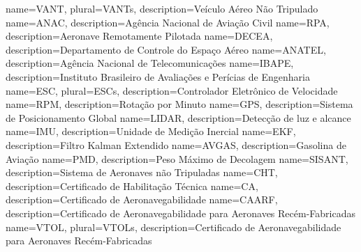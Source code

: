 {
	name={VANT},
	plural={VANTs},
	description={Veículo Aéreo Não Tripulado}
}
{
	name={ANAC},
	description={Agência Nacional de Aviação Civil}
}
{
	name={RPA},
	description={Aeronave Remotamente Pilotada}
}
{
	name={DECEA},
	description={Departamento de Controle do Espaço Aéreo}
}
{
	name={ANATEL},
	description={Agência Nacional de Telecomunicações}
}
{
	name={IBAPE},
	description={Instituto Brasileiro de Avaliações e Perícias de Engenharia}
}
{
	name={ESC},
	plural={ESCs},
	description={Controlador Eletrônico de Velocidade}
}
{
	name={RPM},
	description={Rotação por Minuto}
}
{
	name={GPS},
	description={Sistema de Posicionamento Global}
}
{
	name={LIDAR},
	description={Detecção de luz e alcance}
}
{
	name={IMU},
	description={Unidade de Medição Inercial}
}
{
	name={EKF},
	description={Filtro Kalman Extendido}
}
{
	name={AVGAS},
	description={Gasolina de Aviação}
}
{
	name={PMD},
	description={Peso Máximo de Decolagem}
}
{
	name={SISANT},
	description={Sistema de Aeronaves não Tripuladas}
}
{
	name={CHT},
	description={Certificado de Habilitação Técnica}
}
{
name={CA},
description={Certificado de Aeronavegabilidade}
}
{
name={CAARF},
description={Certificado de Aeronavegabilidade para Aeronaves Recém-Fabricadas}
}
{
name={VTOL},
plural={VTOLs},
description={Certificado de Aeronavegabilidade para Aeronaves Recém-Fabricadas}
}